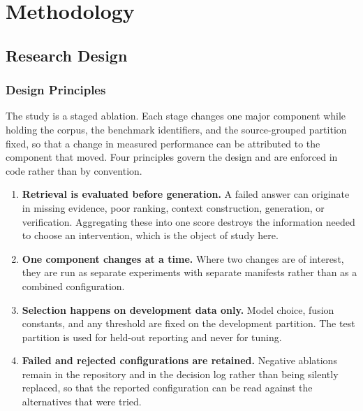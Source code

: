 \chapter{Methodology}
\label{chap:method}


\section{Research Design}
\label{sec:method-design}

\subsection{Design Principles}

The study is a staged ablation. Each stage changes one major component while holding the corpus, the benchmark identifiers, and the source-grouped partition fixed, so that a change in measured performance can be attributed to the component that moved. Four principles govern the design and are enforced in code rather than by convention.

\begin{enumerate}
  \item \textbf{Retrieval is evaluated before generation.} A failed answer can originate in missing evidence, poor ranking, context construction, generation, or verification. Aggregating these into one score destroys the information needed to choose an intervention, which is the object of study here.
  \item \textbf{One component changes at a time.} Where two changes are of interest, they are run as separate experiments with separate manifests rather than as a combined configuration.
  \item \textbf{Selection happens on development data only.} Model choice, fusion constants, and any threshold are fixed on the development partition. The test partition is used for held-out reporting and never for tuning.
  \item \textbf{Failed and rejected configurations are retained.} Negative ablations remain in the repository and in the decision log rather than being silently replaced, so that the reported configuration can be read against the alternatives that were tried.
\end{enumerate}

